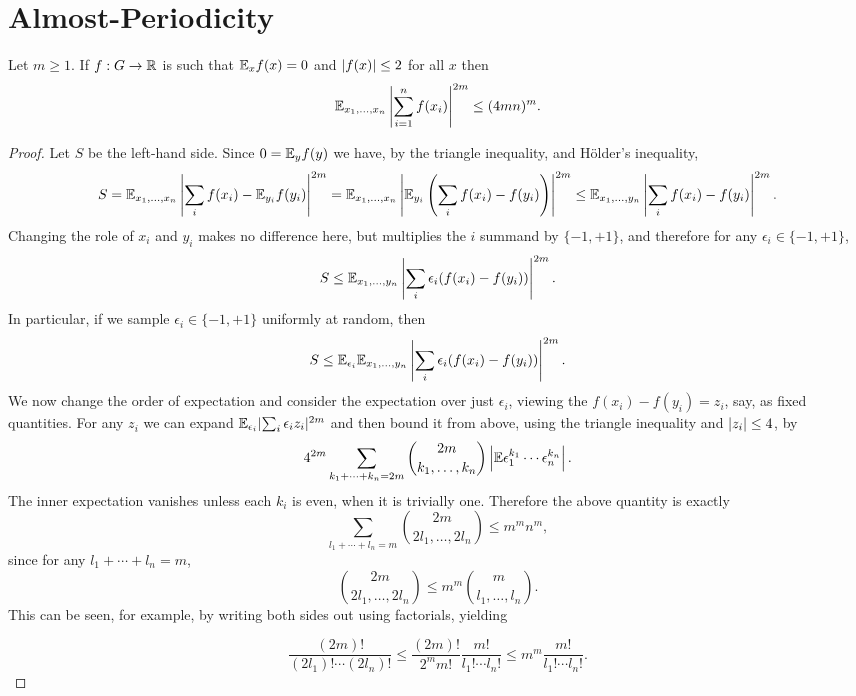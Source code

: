\chapter{Almost-Periodicity}
\label{chap:ap}


\begin{lemma}
\label{mzi}
\leanok
Let $m\geq 1$. If $f:G\to\mathbb{R}$ is such that $\mathbb{E}_x f(x)=0$ and $\left\lvert f(x)\right\rvert\leq 2$ for all $x$ then
\[\mathbb{E}_{x_1,\ldots,x_n} \left\lvert \sum_{i=1}^n f(x_i)\right\rvert^{2m} \leq (4mn)^{m}.\]
\end{lemma}

\begin{proof}
\leanok
Let $S$ be the left-hand side. Since $0=\mathbb{E}_y f(y)$ we have, by the triangle inequality, and H\"{o}lder's inequality,
\[S=\mathbb{E}_{x_1,\ldots,x_n}\left\lvert \sum_i f(x_i) - \mathbb{E}_{y_i} f(y_i)\right\rvert^{2m} = \mathbb{E}_{x_1,\ldots,x_n} \left\lvert\mathbb{E}_{y_i}\left( \sum_i f(x_i)-f(y_i)\right)\right\rvert^{2m}\leq \mathbb{E}_{x_1,\dots,y_n} \left\lvert \sum_i f(x_i)-f(y_i)\right\rvert^{2m}.\]
Changing the role of $x_i$ and $y_i$ makes no difference here, but multiplies the $i$ summand by $\{-1,+1\}$, and therefore for any $\epsilon_i\in\{-1,+1\}$,
\[ S \leq\mathbb{E}_{x_1,\ldots,y_n}\left\lvert \sum_i \epsilon_i(f(x_i)-f(y_i))\right\rvert^{2m}.\]
In particular, if we sample $\epsilon_i\in\{-1,+1\}$ uniformly at random, then
\[ S \leq\mathbb{E}_{\epsilon_i} \mathbb{E}_{x_1,\ldots,y_n}\left\lvert \sum_i \epsilon_i(f(x_i)-f(y_i))\right\rvert^{2m}.\]
We now change the order of expectation and consider the expectation over just $\epsilon_i$, viewing the $f(x_i)-f(y_i)=z_i$, say, as fixed quantities. For any $z_i$ we can expand $\mathbb{E}_{\epsilon_i} \lvert \sum_i \epsilon_iz_i\rvert^{2m}$ and then bound it from above, using the triangle inequality and $\left\lvert z_i\right\rvert\leq 4$, by
\[4^{2m}\sum_{k_1+\cdots+k_n=2m}\binom{2m}{k_1,\ldots,k_n}\left\lvert \mathbb{E}\epsilon_1^{k_1}\cdots \epsilon_n^{k_n}\right\rvert.\]
The inner expectation vanishes unless each $k_i$ is even, when it is trivially one. Therefore the above quantity is exactly
\[\sum_{l_1+\cdots+l_n=m}\binom{2m}{2l_1,\ldots,2l_n}\leq m^mn^m,\]
since for any $l_1+\cdots+l_n=m$,
\[\binom{2m}{2l_1,\ldots,2l_n}\leq m^m\binom{m}{l_1,\ldots,l_n}.\]
This can be seen, for example, by writing both sides out using factorials, yielding

\[\frac{(2m)!}{(2l_1)!\cdots (2l_n)!}\leq \frac{(2m)!}{2^mm!}\frac{m!}{l_1!\cdots l_n!}\leq m^m\frac{m!}{l_1!\cdots l_n!}.\]
\end{proof}


